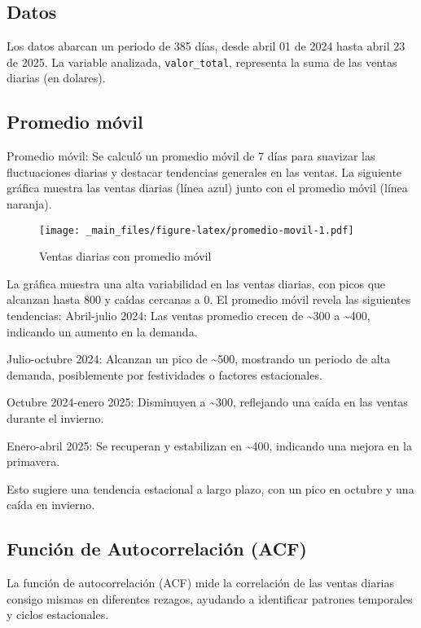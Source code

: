 \documentclass[
]{book}
\begin{document}
\subsection{Datos}\label{datos}

Los datos abarcan un periodo de 385 días, desde abril 01 de 2024 hasta abril 23 de 2025. La variable analizada, \texttt{valor\_total}, representa la suma de las ventas diarias (en dolares).

\subsection{Promedio móvil}\label{promedio-muxf3vil}

Promedio móvil: Se calculó un promedio móvil de 7 días para suavizar las fluctuaciones diarias y destacar tendencias generales en las ventas. La siguiente gráfica muestra las ventas diarias (línea azul) junto con el promedio móvil (línea naranja).

\begin{figure}
\centering
\texttt{[image: \_main\_files/figure-latex/promedio-movil-1.pdf]}
\caption{\label{fig:promedio-movil}Ventas diarias con promedio móvil}
\end{figure}

La gráfica muestra una alta variabilidad en las ventas diarias, con picos que alcanzan hasta 800 y caídas cercanas a 0. El promedio móvil revela las siguientes tendencias:
Abril-julio 2024: Las ventas promedio crecen de \textasciitilde300 a \textasciitilde400, indicando un aumento en la demanda.

Julio-octubre 2024: Alcanzan un pico de \textasciitilde500, mostrando un periodo de alta demanda, posiblemente por festividades o factores estacionales.

Octubre 2024-enero 2025: Disminuyen a \textasciitilde300, reflejando una caída en las ventas durante el invierno.

Enero-abril 2025: Se recuperan y estabilizan en \textasciitilde400, indicando una mejora en la primavera.

Esto sugiere una tendencia estacional a largo plazo, con un pico en octubre y una caída en invierno.

\subsection{Función de Autocorrelación (ACF)}\label{funciuxf3n-de-autocorrelaciuxf3n-acf}

La función de autocorrelación (ACF) mide la correlación de las ventas diarias consigo mismas en diferentes rezagos, ayudando a identificar patrones temporales y ciclos estacionales.
\end{document}
